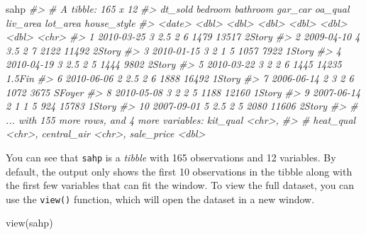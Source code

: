 \documentclass[
]{book}
\newenvironment{Shaded}{\begin{snugshade}}{\end{snugshade}}
\newcommand{\CommentTok}[1]{\textcolor[rgb]{0.56,0.35,0.01}{\textit{#1}}}
\newcommand{\FunctionTok}[1]{\textcolor[rgb]{0.00,0.00,0.00}{#1}}
\newcommand{\NormalTok}[1]{#1}
\begin{document}
\begin{Shaded}
\begin{Highlighting}[]
\NormalTok{sahp}
\CommentTok{\#\textgreater{} \# A tibble: 165 x 12}
\CommentTok{\#\textgreater{}    dt\_sold    bedroom bathroom gar\_car oa\_qual liv\_area lot\_area house\_style}
\CommentTok{\#\textgreater{}    \textless{}date\textgreater{}       \textless{}dbl\textgreater{}    \textless{}dbl\textgreater{}   \textless{}dbl\textgreater{}   \textless{}dbl\textgreater{}    \textless{}dbl\textgreater{}    \textless{}dbl\textgreater{} \textless{}chr\textgreater{}      }
\CommentTok{\#\textgreater{}  1 2010{-}03{-}25       3      2.5       2       6     1479    13517 2Story     }
\CommentTok{\#\textgreater{}  2 2009{-}04{-}10       4      3.5       2       7     2122    11492 2Story     }
\CommentTok{\#\textgreater{}  3 2010{-}01{-}15       3      2         1       5     1057     7922 1Story     }
\CommentTok{\#\textgreater{}  4 2010{-}04{-}19       3      2.5       2       5     1444     9802 2Story     }
\CommentTok{\#\textgreater{}  5 2010{-}03{-}22       3      2         2       6     1445    14235 1.5Fin     }
\CommentTok{\#\textgreater{}  6 2010{-}06{-}06       2      2.5       2       6     1888    16492 1Story     }
\CommentTok{\#\textgreater{}  7 2006{-}06{-}14       2      3         2       6     1072     3675 SFoyer     }
\CommentTok{\#\textgreater{}  8 2010{-}05{-}08       3      2         2       5     1188    12160 1Story     }
\CommentTok{\#\textgreater{}  9 2007{-}06{-}14       2      1         1       5      924    15783 1Story     }
\CommentTok{\#\textgreater{} 10 2007{-}09{-}01       5      2.5       2       5     2080    11606 2Story     }
\CommentTok{\#\textgreater{} \# ... with 155 more rows, and 4 more variables: kit\_qual \textless{}chr\textgreater{},}
\CommentTok{\#\textgreater{} \#   heat\_qual \textless{}chr\textgreater{}, central\_air \textless{}chr\textgreater{}, sale\_price \textless{}dbl\textgreater{}}
\end{Highlighting}
\end{Shaded}

You can see that \texttt{sahp} is a \emph{tibble} with 165 observations and 12 variables. By default, the output only shows the first 10 observations in the tibble along with the first few variables that can fit the window. To view the full dataset, you can use the \texttt{view()} function, which will open the dataset in a new window.

\begin{Shaded}
\begin{Highlighting}[]
\FunctionTok{view}\NormalTok{(sahp)}
\end{Highlighting}
\end{Shaded}
\end{document}
